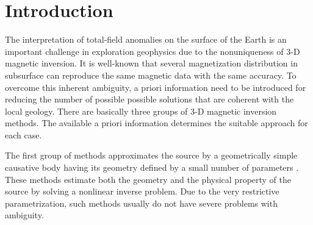 \section{Introduction}

The interpretation of total-field anomalies on the surface of the Earth is an 
important challenge in exploration geophysics due to the nonuniqueness of 3-D magnetic 
inversion. It is well-known that several magnetization distribution in subsurface 
can reproduce the same magnetic data with the same accuracy. 
To overcome this inherent ambiguity, a priori information need to be introduced 
for reducing the number of possible possible solutions that are coherent with the local geology.
There are basically three groups of 3-D magnetic inversion methods. The available 
a priori information determines the suitable approach for each case.

The first group of methods approximates the source by a geometrically 
simple causative body having its geometry defined by a small number of parameters 
\citep[e.g., ][]{ballantyne-1980,bhattacharyya-1980,silva-1983}. These methods 
estimate both the geometry and the physical property of the source by solving 
a nonlinear inverse problem. Due to the very restrictive parametrization, 
such methods usually do not have severe problems with ambiguity.

